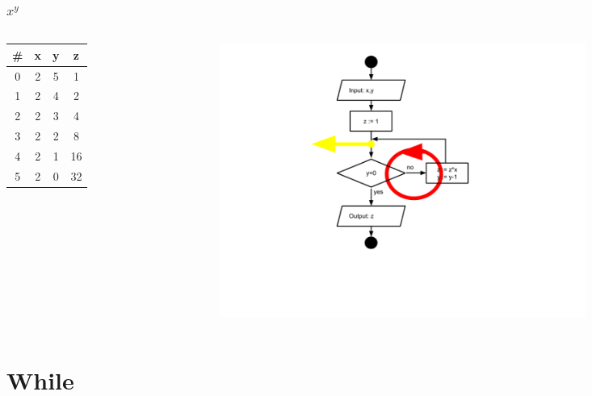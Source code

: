 \documentclass{beamer}
\begin{document}
\begin{frame}[fragile]
\frametitle{$x^y$}


\begin{columns}[c]
  \begin{column}{0.3\textwidth}
\begin{tabular}{ c | c | c | c  }
\hline
\# & x & y & z \\\hline
0 & 2 & 5 & 1 \\\hline
1 & 2 & 4 & 2 \\\hline
2 & 2 & 3 & 4 \\\hline
3 & 2 & 2 & 8 \\\hline
4 & 2 & 1 & 16 \\\hline
5 & 2 & 0 & 32 \\\hline
  
\end{tabular}

  \end{column}
  \begin{column}{0.7\textwidth}

\hspace*{-90pt}
\includegraphics[width=12cm]{images/fc_cycle_arrows_2} 


  \end{column}
\end{columns}


\end{frame}

\section{While} 
\end{document}
